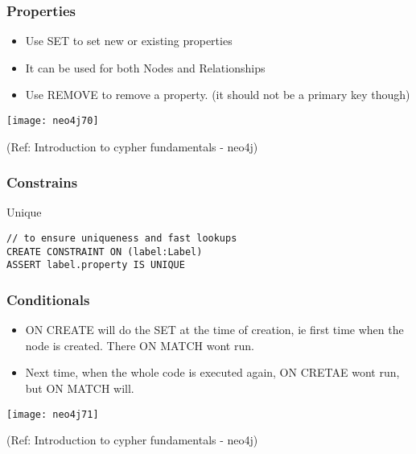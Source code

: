 \begin{frame}[fragile]\frametitle{Properties}

\begin{itemize}
\item Use SET to set new or existing properties
\item It can be used for both Nodes and Relationships
\item Use REMOVE to remove a property. (it should not be a primary key though)
\end{itemize}

\begin{center}
\texttt{[image: neo4j70]}
\end{center}	  


{\tiny (Ref: Introduction to cypher fundamentals  - neo4j)}

\end{frame}


\begin{frame}[fragile]\frametitle{Constrains}
Unique

\begin{lstlisting}
// to ensure uniqueness and fast lookups
CREATE CONSTRAINT ON (label:Label)
ASSERT label.property IS UNIQUE
\end{lstlisting}	  

\end{frame}

\begin{frame}[fragile]\frametitle{Conditionals}

\begin{itemize}
\item ON CREATE will do the SET at the time of creation, ie first time when the node is created. There ON MATCH wont run.
\item Next time, when the whole code is executed again, ON CRETAE wont run, but ON MATCH will.
\end{itemize}

\begin{center}
\texttt{[image: neo4j71]}
\end{center}	  


{\tiny (Ref: Introduction to cypher fundamentals  - neo4j)}
 

\end{frame}

